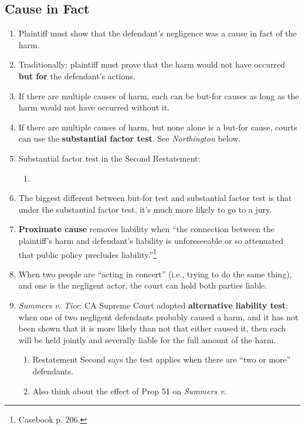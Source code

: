 \subsection{Cause in Fact}

\begin{enumerate}
    \item Plaintiff must show that the defendant's negligence was a cause in 
    fact of the harm.
    \item Traditionally: plaintiff must prove that the harm would not have 
    occurred \textbf{but for} the defendant's actions.
    \item If there are multiple causes of harm, each can be but-for causes as 
    long as the harm would not have occurred without it.
    \item If there are multiple causes of harm, but none alone is a but-for 
    cause, courts can use the \textbf{substantial factor test}. See 
    \emph{Northington} below.
    \item Substantial factor test in the Second Restatement:
    \begin{enumerate}
        \item %
    \end{enumerate}
    \item The biggest different between but-for test and substantial factor 
    test is that under the substantial factor test, it's much more likely to 
    go to a jury.
    \item \textbf{Proximate cause} removes liability when ``the connection 
    between the plaintiff's harm and defendant's liability is unforeseeable or 
    so attenuated that public policy precludes liability.''\footnote{Casebook 
    p. 206.}
    \item When two people are ``acting in concert'' (i.e., trying to do the 
    same thing), and one is the negligent actor, the court can hold both 
    parties liable.
    \item \emph{Summers v. Tice}: CA Supreme Court adopted \textbf{alternative 
    liability test}: when one of two negligent defendants probably caused a 
    harm, and it has not been shown that it is more likely than not that 
    either caused it, then each will be held jointly and severally liable for 
    the full amount of the harm.
    \begin{enumerate}
        \item Restatement Second says the test applies when there are ``two or 
        more'' defendants.
        \item Also think about the effect of Prop 51 on \emph{Summers v. 
}
\end{enumerate}
\end{enumerate}
